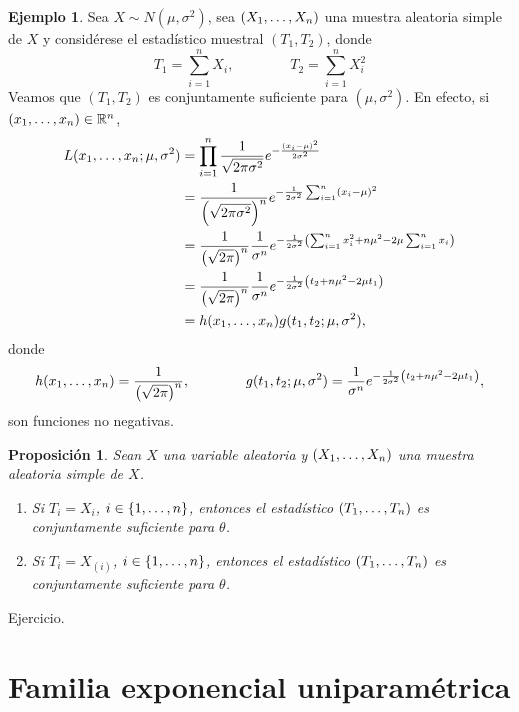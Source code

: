 \documentclass[11pt]{report}
\makeatletter
\renewenvironment{proof}[1][\proofname]{\par
  \pushQED{\qed}%
  \normalfont \topsep\z@skip %
  \trivlist
  \item[\hskip\labelsep
        \itshape
    #1\@addpunct{.}]\ignorespaces
}{%
  \popQED\endtrivlist\@endpefalse
}
\newtheorem{proposition}{Proposición}
\theoremstyle{definition}
\newtheorem{example}{Ejemplo}
\newcommand{\R}{\mathbb R}
\makeatother
\begin{document}
\begin{example}
Sea $X \sim N(\mu,\sigma^2)$, sea $(X_1,\mathellipsis,X_n)$ una muestra aleatoria simple de $X$ y considérese el estadístico muestral $(T_1,T_2)$, donde
\[T_1 = \sum_{i=1}^n X_i, \qquad \qquad T_2 = \sum_{i=1}^nX_i^2\]
Veamos que $(T_1,T_2)$ es conjuntamente suficiente para $(\mu,\sigma^2)$. En efecto, si $(x_1,\mathellipsis,x_n) \in \R^n$,
\[
\begin{aligned}[t]
L(x_1,\mathellipsis,x_n;\mu,\sigma^2) &=\prod_{i=1}^n\frac{1}{\sqrt{2\pi\sigma^2}}e^{-\frac{(x_i-\mu)^2}{2\sigma^2}} 
\\ &= \frac{1}{\left(\sqrt{2\pi\sigma^2}\right)^n}e^{-\frac{1}{2\sigma^2}\sum_{i=1}^n (x_i-\mu)^2} \\ &= \frac{1}{\left(\sqrt{2\pi}\right)^n}\frac{1}{\sigma^n}e^{-\frac{1}{2\sigma^2}\left(\sum_{i=1}^n x_i^2+n\mu^2-2\mu\sum_{i=1}^n x_i\right)} \\
&= \frac{1}{\left(\sqrt{2\pi}\right)^n}\frac{1}{\sigma^n}e^{-\frac{1}{2\sigma^2}\left(t_2+n\mu^2-2\mu t_1\right)} \\
&= h(x_1,\mathellipsis,x_n)g(t_1,t_2;\mu,\sigma^2),
\end{aligned}
\]
donde
\[h(x_1,\mathellipsis,x_n) = \frac{1}{\left(\sqrt{2\pi}\right)^n}, \qquad \qquad g(t_1,t_2;\mu,\sigma^2) = \frac{1}{\sigma^n}e^{-\frac{1}{2\sigma^2}\left(t_2+n\mu^2-2\mu t_1\right)},\]
son funciones no negativas.
\end{example}

\begin{proposition}
Sean $X$ una variable aleatoria y $(X_1,\mathellipsis,X_n)$ una muestra aleatoria simple de $X$.
\begin{enumerate}
    \item Si $T_i=X_i$, $i \in \{1,\mathellipsis,n\}$, entonces el estadístico $(T_1,\mathellipsis,T_n)$ es conjuntamente suficiente para $\theta$.
    \item Si $T_i = X_{(i)}$, $i \in \{1,\mathellipsis,n\}$, entonces el estadístico $(T_1,\mathellipsis,T_n)$ es conjuntamente suficiente para $\theta$.
\end{enumerate}
\end{proposition}
\begin{proof}
    Ejercicio.
\end{proof}

\section{Familia exponencial uniparamétrica}
\end{document}
